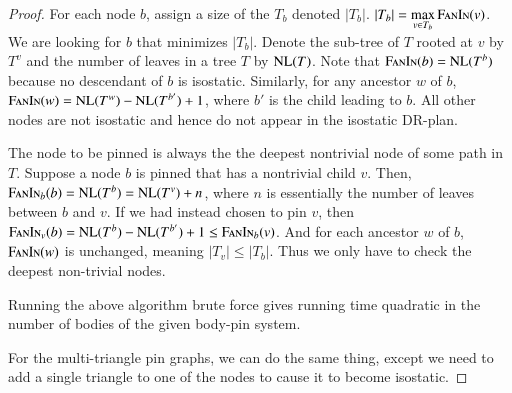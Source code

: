 \begin{proof}
    For each node $b$, assign a size of the $T_b$ denoted $|T_b|$. $|T_b| = \displaystyle\max_{v \in T_b} \textsc{FanIn}(v)$. We are looking for $b$ that minimizes $|T_b|$. Denote the sub-tree of $T$ rooted at $v$ by $T^v$ and the number of leaves in a tree $T$ by $\textsc{NL}(T)$. Note that $\textsc{FanIn}(b)= \textsc{NL}(T^b)$ because no descendant of $b$ is isostatic. Similarly, for any ancestor $w$ of $b$, $\textsc{FanIn}(w) = \textsc{NL}(T^w)-\textsc{NL}(T^{b'})+1$, where $b'$ is the child leading to $b$. All other nodes are not isostatic and hence do not appear in the isostatic DR-plan.

    The node to be pinned is always the the deepest nontrivial node of some path in $T$. Suppose a node $b$ is pinned that has a nontrivial child $v$. Then, $\textsc{FanIn}_{b}(b) = \textsc{NL}(T^b) = \textsc{NL}(T^v) + n$, where $n$ is essentially the number of leaves between $b$ and $v$. If we had instead chosen to pin $v$, then $\textsc{FanIn}_{v}(b) = \textsc{NL}(T^b) - \textsc{NL}(T^{b'}) + 1 \leq \textsc{FanIn}_{b}(v)$. And for each ancestor $w$ of $b$, $\textsc{FanIn}(w)$ is unchanged, meaning $|T_v| \leq |T_b|$. Thus we only have to check the deepest non-trivial nodes.

    Running the above algorithm brute force  gives running time quadratic in the number of bodies of the given body-pin system.

    For the multi-triangle pin graphs, we can do the same thing, except we need to add a single triangle to one of the nodes to cause it to become isostatic.
\end{proof}

